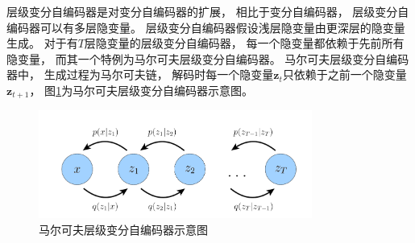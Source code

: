 层级变分自编码器是对变分自编码器的扩展{\cite{Luo2022UnderstandingDM}}，
相比于变分自编码器，
层级变分自编码器可以有多层隐变量。
层级变分自编码器假设浅层隐变量由更深层的隐变量生成。
对于有{$T$}层隐变量的层级变分自编码器，
每一个隐变量都依赖于先前所有隐变量，
而其一个特例为马尔可夫层级变分自编码器。
马尔可夫层级变分自编码器中，
生成过程为马尔可夫链，
解码时每一个隐变量{$\bm{z}_{t}$}只依赖于之前一个隐变量{$\bm{z}_{t+1}$}，
图{\ref{fig:markovian_hierarchical_variational_autoencoder}}为马尔可夫层级变分自编码器示意图。
\begin{figure}[ht]
    \centering
    \includegraphics[width=0.8\textwidth]{figures/markovian_hierarchical_variational_autoencoder}
    \caption{马尔可夫层级变分自编码器示意图}\label{fig:markovian_hierarchical_variational_autoencoder}
\end{figure}


